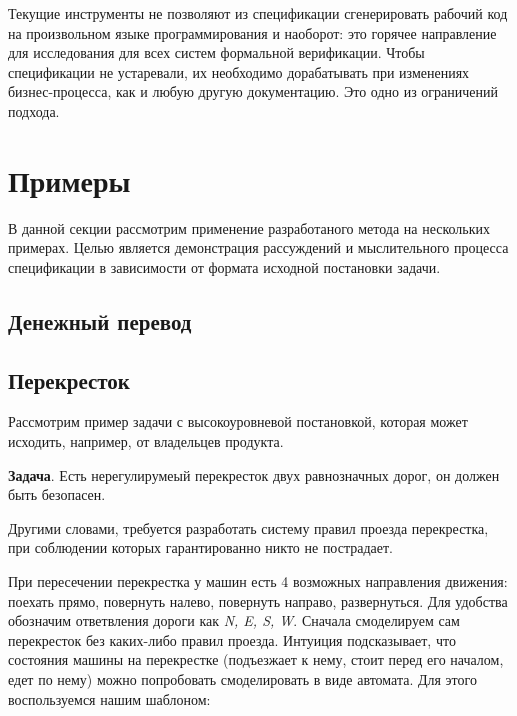 \documentclass[14pt, openany]{book}
\begin{document}
Текущие инструменты не позволяют из спецификации сгенерировать рабочий код на произвольном языке программирования и наоборот: это горячее направление для исследования для всех систем формальной верификации. Чтобы спецификации не устаревали, их необходимо дорабатывать при изменениях бизнес-процесса, как и любую другую документацию. Это одно из ограничений подхода.

\section{Примеры}
В данной секции рассмотрим применение разработаного метода на нескольких примерах.
Целью является демонстрация рассуждений и мыслительного процесса спецификации в зависимости от формата исходной постановки задачи.

\subsection{Денежный перевод}

\subsection{Перекресток}
Рассмотрим пример задачи с высокоуровневой постановкой, которая может исходить, например, от владельцев продукта.

\textbf{Задача}. Есть нерегулирумеый перекресток двух равнозначных дорог, он должен быть безопасен.

Другими словами, требуется разработать систему правил проезда перекрестка, при соблюдении которых гарантированно никто не пострадает.

При пересечении перекрестка у машин есть 4 возможных направления движения: поехать прямо, повернуть налево, повернуть направо, развернуться. Для удобства обозначим ответвления дороги как \emph{N, E, S, W}. Сначала смоделируем сам перекресток без каких-либо правил проезда. Интуиция подсказывает, что состояния машины на перекрестке (подъезжает к нему, стоит перед его началом, едет по нему) можно попробовать смоделировать в виде автомата. Для этого воспользуемся нашим шаблоном:
\end{document}
